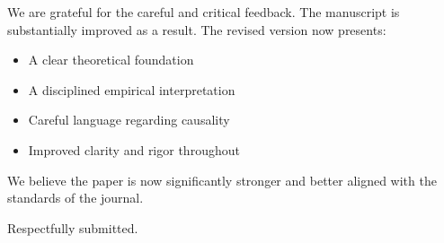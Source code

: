 \documentclass[12pt]{article}
\begin{document}
We are grateful for the careful and critical feedback. The manuscript is substantially improved as a result. The revised version now presents:

\begin{itemize}
\item A clear theoretical foundation
\item A disciplined empirical interpretation
\item Careful language regarding causality
\item Improved clarity and rigor throughout
\end{itemize}

We believe the paper is now significantly stronger and better aligned with the standards of the journal.

\bigskip

Respectfully submitted.
\end{document}
